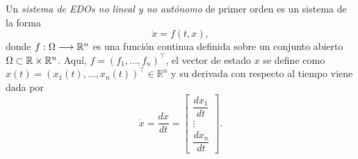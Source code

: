 %
%
%
%
%
%
%
%
%
%
%


Un \textit{sistema de EDOs no lineal y no autónomo} de primer orden es un sistema de la forma
\begin{equation}
	\dot{x} = f(t, x),
	\label{eq: generalFormSisEDOs}
\end{equation}
donde $f: \Omega \longrightarrow {\mathbb{R}}^{n}$ es una función continua definida sobre un conjunto abierto $\Omega \subset {\mathbb{R}} \times {\mathbb{R}}^{n}$. Aquí, $f = (f_1, \ldots, f_n)^\top$, el vector de estado $x$ se define como $x(t) = (x_{1}(t), \ldots, x_{n}(t))^\top \in \mathbb{R}^n$ y su derivada con respecto al tiempo viene dada por
\begin{equation*}
	\dot{x} = \dfrac{dx}{dt} = 
	\begin{bmatrix}
			\dfrac{dx_{1}}{dt} \\
			\vdots \\
			\dfrac{dx_{n}}{dt}
		\end{bmatrix}.
\end{equation*}

